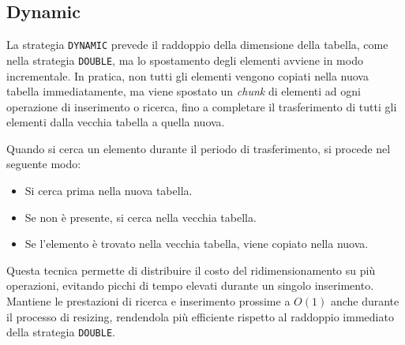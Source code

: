 \subsection{Dynamic}

La strategia \texttt{DYNAMIC} prevede il raddoppio della dimensione della tabella, come nella strategia \texttt{DOUBLE}, 
ma lo spostamento degli elementi avviene in modo incrementale.  
In pratica, non tutti gli elementi vengono copiati nella nuova tabella immediatamente, ma viene spostato un \textit{chunk} di elementi 
ad ogni operazione di inserimento o ricerca, fino a completare il trasferimento di tutti gli elementi dalla vecchia tabella a quella nuova.

Quando si cerca un elemento durante il periodo di trasferimento, si procede nel seguente modo:
\begin{itemize}
    \item Si cerca prima nella nuova tabella.
    \item Se non è presente, si cerca nella vecchia tabella.
    \item Se l’elemento è trovato nella vecchia tabella, viene copiato nella nuova.
\end{itemize}

Questa tecnica permette di distribuire il costo del ridimensionamento su più operazioni, evitando picchi di tempo elevati durante un singolo inserimento.  
Mantiene le prestazioni di ricerca e inserimento prossime a $O(1)$ anche durante il processo di resizing, 
rendendola più efficiente rispetto al raddoppio immediato della strategia \texttt{DOUBLE}.